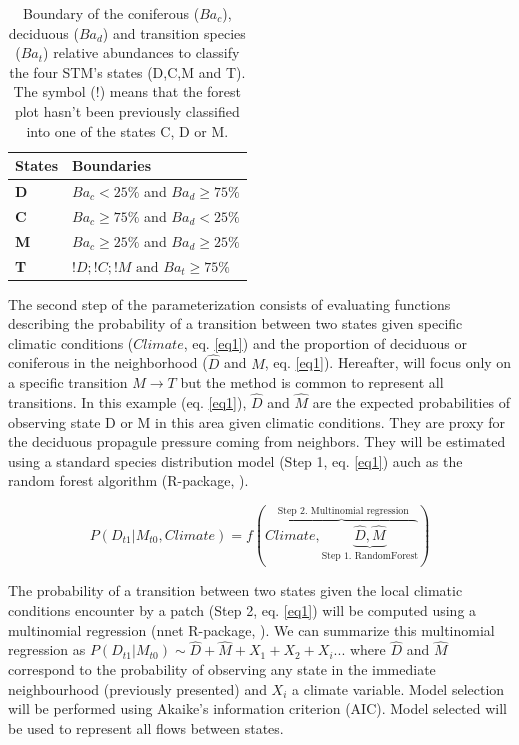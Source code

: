 \begin{table}[h]
\vspace{-1em}
\centering
\caption{Boundary of the coniferous ($Ba_c$), deciduous ($Ba_d$) and transition species ($Ba_t$) relative abundances to classify the four STM's states (D,C,M and T). The symbol ($!$) means that the forest plot hasn't been previously classified into one of the states C, D or M.}
\vspace{-1em}
\begin{tabular}{ll}
	States  & Boundaries                            \\
	\hline
	\textbf{D} & $Ba_c< 25\%$ and $Ba_d \geq 75\%$    \\
	\textbf{C} & $Ba_c \geq 75\%$ and $Ba_d < 25\%$    \\
	\textbf{M} & $Ba_c \geq 25\%$ and $Ba_d \geq 25\%$ \\
	\textbf{T} & $!D;!C;!M \text{ and }  Ba_t  \geq 75\%$                                
\end{tabular}

\label{bound}
\end{table}

The second step of the parameterization consists of evaluating functions
describing the probability of a transition between two states given specific
climatic conditions ($Climate$, eq. \ref{eq1}) and the proportion of deciduous
or coniferous in the neighborhood ($\hat{D}$ and $\hat{M}$, eq. \ref{eq1}).
Hereafter, will focus only on a specific transition $M \rightarrow T$ but the
method is common to represent  all transitions. In this example (eq.
\ref{eq1}),  $\hat{D}$ and $\hat{M}$ are the expected probabilities of
observing state D or M in this area given climatic conditions. They are proxy
for the deciduous propagule pressure coming from neighbors. They will be
estimated using  a standard species distribution model (Step 1, eq. \ref{eq1})
auch as the random forest algorithm (R-package, \cite{Liaw2002a}).

\begin{equation}
	P(D_{t1}|M_{t0}, Climate) = f(\overbrace{Climate, \underbrace{\hat{D}, \hat{M}}_\text{Step 1. RandomForest}}^\text{ Step 2. Multinomial regression})
\label{eq1}
\end{equation}

The probability of a transition between two states given the local climatic
conditions encounter by a patch (Step 2, eq. \ref{eq1}) will be computed using a multinomial
regression (nnet R-package, \cite{Venables2002}). We can summarize this
multinomial regression as $P(D_{t1}|M_{t0}) \sim \hat{D} + \hat{M} +
X_1+X_2+X_i... $ where $\hat{D}$ and $\hat{M}$ correspond to the probability
of observing any state in the immediate neighbourhood (previously presented)
and $X_i$ a climate variable. Model selection will be performed using Akaike's
information criterion (AIC). Model selected will be used to represent all
flows between states.   \\

